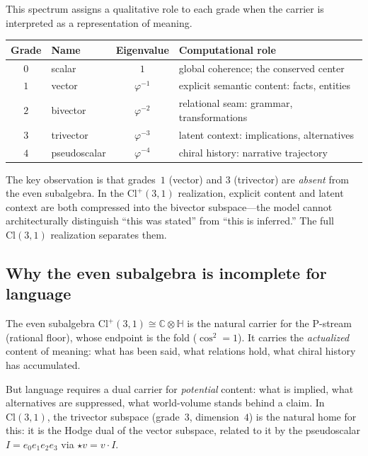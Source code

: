 \documentclass[11pt,a4paper]{article}
\theoremstyle{plain}
\theoremstyle{definition}
\theoremstyle{remark}
\numberwithin{equation}{section}
\providecommand{\Cl}{\mathrm{Cl}}
\providecommand{\C}{\mathbb{C}}
\providecommand{\HH}{\mathbb{H}}
\providecommand{\vp}{\varphi}
\begin{document}
This spectrum assigns a qualitative role to each grade when the
carrier is interpreted as a representation of meaning.

\begin{center}
\renewcommand{\arraystretch}{1.35}
\begin{tabular}{clcl}
\toprule
\textbf{Grade} & \textbf{Name} & \textbf{Eigenvalue}
  & \textbf{Computational role} \\
\midrule
$0$ & scalar       & $1$         & global coherence; the conserved center \\
$1$ & vector       & $\vp^{-1}$  & explicit semantic content: facts, entities \\
$2$ & bivector     & $\vp^{-2}$  & relational seam: grammar, transformations \\
$3$ & trivector    & $\vp^{-3}$  & latent context: implications, alternatives \\
$4$ & pseudoscalar & $\vp^{-4}$  & chiral history: narrative trajectory \\
\bottomrule
\end{tabular}
\end{center}

The key observation is that grades~$1$ (vector) and $3$ (trivector)
are \emph{absent} from the even subalgebra.  In the $\Cl^+(3,1)$
realization, explicit content and latent context are both compressed
into the bivector subspace---the model cannot architecturally
distinguish ``this was stated'' from ``this is inferred.''  The full
$\Cl(3,1)$ realization separates them.

\subsection{Why the even subalgebra is incomplete for language}

The even subalgebra $\Cl^+(3,1) \cong \C \otimes \HH$ is the
natural carrier for the P-stream (rational floor), whose endpoint is
the fold ($\cos^2 = 1$).  It carries the \emph{actualized} content
of meaning: what has been said, what relations hold, what chiral
history has accumulated.

But language requires a dual carrier for \emph{potential} content:
what is implied, what alternatives are suppressed, what world-volume
stands behind a claim.  In $\Cl(3,1)$, the trivector subspace
(grade~$3$, dimension~$4$) is the natural home for this: it is the
Hodge dual of the vector subspace, related to it by the pseudoscalar
$I = e_0 e_1 e_2 e_3$ via $\star v = v \cdot I$.
\end{document}

